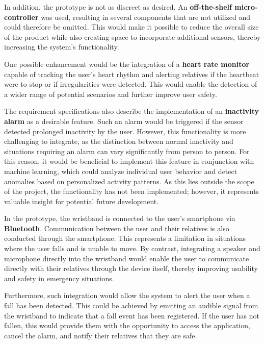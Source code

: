 In addition, the prototype is not as discreet as desired. An \textbf{off-the-shelf micro-controller} was used, resulting in several components that are not utilized and could therefore be omitted. This would make it possible to reduce the overall size of the product while also creating space to incorporate additional sensors, thereby increasing the system’s functionality.

One possible enhancement would be the integration of a \textbf{heart rate monitor} capable of tracking the user’s heart rhythm and alerting relatives if the heartbeat were to stop or if irregularities were detected. This would enable the detection of a wider range of potential scenarios and further improve user safety.

The requirement specifications also describe the implementation of an \textbf{inactivity alarm} as a desirable feature. Such an alarm would be triggered if the sensor detected prolonged inactivity by the user. However, this functionality is more challenging to integrate, as the distinction between normal inactivity and situations requiring an alarm can vary significantly from person to person. For this reason, it would be beneficial to implement this feature in conjunction with machine learning, which could analyze individual user behavior and detect anomalies based on personalized activity patterns. As this lies outside the scope of the project, the functionality has not been implemented; however, it represents valuable insight for potential future development.

In the prototype, the wristband is connected to the user’s smartphone via \textbf{Bluetooth}. Communication between the user and their relatives is also conducted through the smartphone. This represents a limitation in situations where the user falls and is unable to move. By contrast, integrating a speaker and microphone directly into the wristband would enable the user to communicate directly with their relatives through the device itself, thereby improving usability and safety in emergency situations.

Furthermore, such integration would allow the system to alert the user when a fall has been detected. This could be achieved by emitting an audible signal from the wristband to indicate that a fall event has been registered. If the user has not fallen, this would provide them with the opportunity to access the application, cancel the alarm, and notify their relatives that they are safe.

